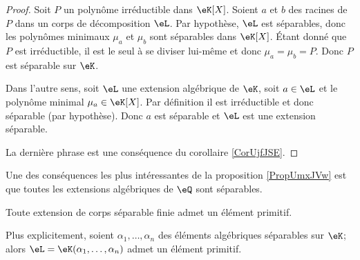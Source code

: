 \begin{proof}
    Soit \( P\) un polynôme irréductible dans \( \eK[X]\). Soient \( a\) et \( b\) des racines de \( P\) dans un corps de décomposition \( \eL\). Par hypothèse, \( \eL\) est séparables, donc les polynômes minimaux \( \mu_a\) et \( \mu_b\) sont séparables dans \( \eK[X]\). Étant donné que \( P\) est irréductible, il est le seul à se diviser lui-même et donc \( \mu_a=\mu_b=P\). Donc \( P\) est séparable sur \( \eK\).

    Dans l'autre sens, soit \( \eL\) une extension algébrique de \( \eK\), soit \( a\in \eL\) et le polynôme minimal \( \mu_a\in \eK[X]\). Par définition il est irréductible et donc séparable (par hypothèse). Donc \( a\) est séparable et \( \eL\) est une extension séparable.

    La dernière phrase est une conséquence du corollaire \ref{CorUjfJSE}.
\end{proof}

\begin{example} \label{ExvQTyBl}
    Une des conséquences les plus intéressantes de la proposition \ref{PropUmxJVw} est que toutes les extensions algébriques de \( \eQ\) sont séparables.
\end{example}

\begin{theorem}   \label{ThoORxgBC}
    Toute extension de corps séparable finie admet un élément primitif.

    Plus explicitement, soient \( \alpha_1,\ldots, \alpha_n\) des éléments algébriques séparables sur \( \eK\); alors \( \eL=\eK(\alpha_1,\ldots, \alpha_n)\) admet un élément primitif.
\end{theorem}

